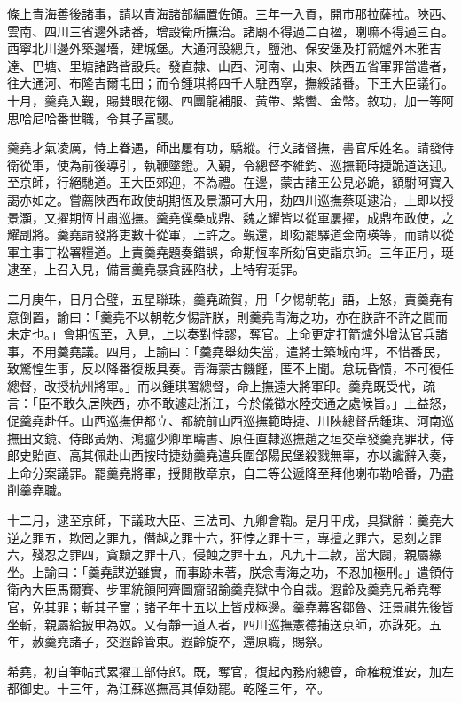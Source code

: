 \begin{pinyinscope}
條上青海善後諸事，請以青海諸部編置佐領。三年一入貢，開市那拉薩拉。陜西、雲南、四川三省邊外諸番，增設衛所撫治。諸廟不得過二百楹，喇嘛不得過三百。西寧北川邊外築邊墻，建城堡。大通河設總兵，鹽池、保安堡及打箭爐外木雅吉達、巴塘、里塘諸路皆設兵。發直隸、山西、河南、山東、陜西五省軍罪當遣者，往大通河、布隆吉爾屯田；而令鍾琪將四千人駐西寧，撫綏諸番。下王大臣議行。十月，羹堯入覲，賜雙眼花翎、四團龍補服、黃帶、紫轡、金幣。敘功，加一等阿思哈尼哈番世職，令其子富襲。

羹堯才氣凌厲，恃上眷遇，師出屢有功，驕縱。行文諸督撫，書官斥姓名。請發侍衛從軍，使為前後導引，執鞭墜鐙。入覲，令總督李維鈞、巡撫範時捷跪道送迎。至京師，行絕馳道。王大臣郊迎，不為禮。在邊，蒙古諸王公見必跪，額駙阿寶入謁亦如之。嘗薦陜西布政使胡期恆及景灝可大用，劾四川巡撫蔡珽逮治，上即以授景灝，又擢期恆甘肅巡撫。羹堯僕桑成鼎、魏之耀皆以從軍屢擢，成鼎布政使，之耀副將。羹堯請發將吏數十從軍，上許之。覲還，即劾罷驛道金南瑛等，而請以從軍主事丁松署糧道。上責羹堯題奏錯誤，命期恆率所劾官吏詣京師。三年正月，珽逮至，上召入見，備言羹堯暴貪誣陷狀，上特宥珽罪。

二月庚午，日月合璧，五星聯珠，羹堯疏賀，用「夕惕朝乾」語，上怒，責羹堯有意倒置，諭曰：「羹堯不以朝乾夕惕許朕，則羹堯青海之功，亦在朕許不許之間而未定也。」會期恆至，入見，上以奏對悖謬，奪官。上命更定打箭爐外增汰官兵諸事，不用羹堯議。四月，上諭曰：「羹堯舉劾失當，遣將士築城南坪，不惜番民，致驚惶生事，反以降番復叛具奏。青海蒙古饑饉，匿不上聞。怠玩昏憒，不可復任總督，改授杭州將軍。」而以鍾琪署總督，命上撫遠大將軍印。羹堯既受代，疏言：「臣不敢久居陜西，亦不敢遽赴浙江，今於儀徵水陸交通之處候旨。」上益怒，促羹堯赴任。山西巡撫伊都立、都統前山西巡撫範時捷、川陜總督岳鍾琪、河南巡撫田文鏡、侍郎黃炳、鴻臚少卿單疇書、原任直隸巡撫趙之垣交章發羹堯罪狀，侍郎史貽直、高其佩赴山西按時捷劾羹堯遣兵圍郃陽民堡殺戮無辜，亦以讞辭入奏，上命分案議罪。罷羹堯將軍，授閒散章京，自二等公遞降至拜他喇布勒哈番，乃盡削羹堯職。

十二月，逮至京師，下議政大臣、三法司、九卿會鞫。是月甲戌，具獄辭：羹堯大逆之罪五，欺罔之罪九，僭越之罪十六，狂悖之罪十三，專擅之罪六，忌刻之罪六，殘忍之罪四，貪黷之罪十八，侵蝕之罪十五，凡九十二款，當大闢，親屬緣坐。上諭曰：「羹堯謀逆雖實，而事跡未著，朕念青海之功，不忍加極刑。」遣領侍衛內大臣馬爾賽、步軍統領阿齊圖齎詔諭羹堯獄中令自裁。遐齡及羹堯兄希堯奪官，免其罪；斬其子富；諸子年十五以上皆戍極邊。羹堯幕客鄒魯、汪景祺先後皆坐斬，親屬給披甲為奴。又有靜一道人者，四川巡撫憲德捕送京師，亦誅死。五年，赦羹堯諸子，交遐齡管束。遐齡旋卒，還原職，賜祭。

希堯，初自筆帖式累擢工部侍郎。既，奪官，復起內務府總管，命榷稅淮安，加左都御史。十三年，為江蘇巡撫高其倬劾罷。乾隆三年，卒。


\end{pinyinscope}
